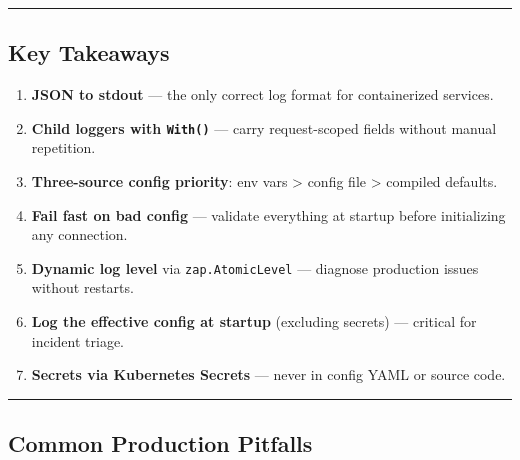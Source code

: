 \documentclass[
]{article}
\providecommand{\tightlist}{%
  \setlength{\itemsep}{0pt}\setlength{\parskip}{0pt}}
\begin{document}
\begin{center}\rule{0.5\linewidth}{0.5pt}\end{center}

\hypertarget{key-takeaways-1}{%
\subsection{Key Takeaways}\label{key-takeaways-1}}

\begin{enumerate}
\def\labelenumi{\arabic{enumi}.}
\tightlist
\item
  \textbf{JSON to stdout} --- the only correct log format for
  containerized services.
\item
  \textbf{Child loggers with \texttt{With()}} --- carry request-scoped
  fields without manual repetition.
\item
  \textbf{Three-source config priority}: env vars \textgreater{} config
  file \textgreater{} compiled defaults.
\item
  \textbf{Fail fast on bad config} --- validate everything at startup
  before initializing any connection.
\item
  \textbf{Dynamic log level} via \texttt{zap.AtomicLevel} --- diagnose
  production issues without restarts.
\item
  \textbf{Log the effective config at startup} (excluding secrets) ---
  critical for incident triage.
\item
  \textbf{Secrets via Kubernetes Secrets} --- never in config YAML or
  source code.
\end{enumerate}

\begin{center}\rule{0.5\linewidth}{0.5pt}\end{center}

\hypertarget{common-production-pitfalls-1}{%
\subsection{Common Production
Pitfalls}\label{common-production-pitfalls-1}}
\end{document}
